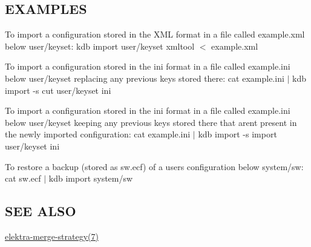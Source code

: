 \subsection*{E\+X\+A\+M\+P\+L\+ES}

To import a configuration stored in the X\+ML format in a file called {\ttfamily example.\+xml} below {\ttfamily user/keyset}\+: {\ttfamily kdb import user/keyset xmltool $<$ example.\+xml}

To import a configuration stored in the {\ttfamily ini} format in a file called {\ttfamily example.\+ini} below {\ttfamily user/keyset} replacing any previous keys stored there\+: {\ttfamily cat example.\+ini $\vert$ kdb import -\/s cut user/keyset ini}

To import a configuration stored in the {\ttfamily ini} format in a file called {\ttfamily example.\+ini} below {\ttfamily user/keyset} keeping any previous keys stored there that aren\textquotesingle{}t present in the newly imported configuration\+: {\ttfamily cat example.\+ini $\vert$ kdb import -\/s import user/keyset ini}

To restore a backup (stored as {\ttfamily sw.\+ecf}) of a user\textquotesingle{}s configuration below {\ttfamily system/sw}\+: {\ttfamily cat sw.\+ecf $\vert$ kdb import system/sw}

\subsection*{S\+EE A\+L\+SO}


\begin{DoxyItemize}
\item \hyperlink{md_doc_help_elektra-merge-strategy_doc_help_elektra-merge-strategy_md}{elektra-\/merge-\/strategy(7)} 
\end{DoxyItemize}